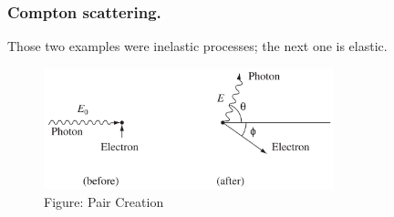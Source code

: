 \documentclass[../main.tex]{subfiles}
\begin{document}
\subsubsection*{Compton scattering.} Those two examples were inelastic processes; the next one is elastic.
\begin{figure}[b]
    \centering
    \includegraphics[width=0.75\textwidth]{../Rss/Relativity/Appendix/Compton.png}
    \caption*{Figure: Pair Creation}
\end{figure}
\end{document}
